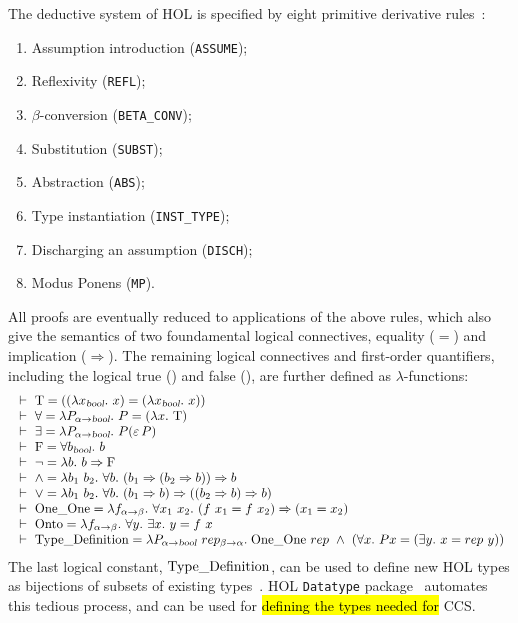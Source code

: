 The deductive system of HOL is specified by eight primitive
derivative rules~\cite{hollogic}:
\begin{enumerate}
\item Assumption introduction (\texttt{ASSUME});
\item Reflexivity (\texttt{REFL});
\item $\beta$-conversion (\texttt{BETA\_CONV});
\item Substitution (\texttt{SUBST});
\item Abstraction (\texttt{ABS});
\item Type instantiation (\texttt{INST\_TYPE});
\item Discharging an assumption (\texttt{DISCH});
\item Modus Ponens (\texttt{MP}).
\end{enumerate}
All proofs are eventually reduced to applications of the above rules,
which also give the semantics of two foundamental
logical connectives,  equality ($=$) and implication
($\Rightarrow$). The remaining logical connectives and first-order
quantifiers, including the logical true () and false (), are
further defined as $\lambda$-functions: 
\begin{equation*}
\begin{array}{l}
\ \vdash\  \mathrm{T}       =  ((\lambda x_{\textsl{bool}}.\ x) =
               (\lambda x_{\textsl{bool}}.\ x))    \\
\ \vdash\  \forall  =  \lambda P_{\alpha{\to}\textsl{bool}}.\  P =
                    (\lambda x.\ \mathrm{T} ) \\
\ \vdash\  \exists  =  \lambda P_{\alpha{\to}\textsl{bool}}.\  P({\varepsilon}\, P) \\
\ \vdash\  \mathrm{F}  =  \forall b_{\textsl{bool}}.\  b  \\
\ \vdash\  \neg    =  \lambda b.\  b \Rightarrow \mathrm{F} \\
\ \vdash\  {\wedge}  =  \lambda b_1\ b_2.\ \forall b.\  (b_1\Rightarrow (b_2 \Rightarrow b)) \Rightarrow b \\
\ \vdash\  {\vee}  =  \lambda b_1\ b_2.\ \forall b.\  (b_1 \Rightarrow b)\Rightarrow ((b_2 \Rightarrow b) \Rightarrow b) \\
\ \vdash\  \mathrm{One\_One}  =  \lambda f_{\alpha {\to}\beta}.\ \forall x_1\ x_2.\ 
                    (f\ x_1 = f\ x_2)  \Rightarrow (x_1 = x_2) \\
\ \vdash\  \mathrm{Onto}  =  \lambda f_{\alpha{\to}\beta}.\ 
                  \forall y.\ \exists x.\  y = f\ x \\
\ \vdash\  \mathrm{Type\_Definition}  =  \lambda P_{\alpha{\to}\textsl{bool}}\
                  rep_{\beta{\to}\alpha}.\;
                  \mathrm{One\_One}\ rep \ \wedge{}\  (\forall x.\ P x = (\exists y.\  x = rep\ y))
\end{array}
\end{equation*}
The last logical constant,
$\mathrm{Type\_Definition}$, can be used to define new HOL types as bijections of
subsets of existing types~\cite{Melham:1989dk}.
HOL \texttt{Datatype} package~\cite{Melham:1991, holdesc} automates
this tedious process, and can be used for \hl{defining the 
types needed for} CCS.

